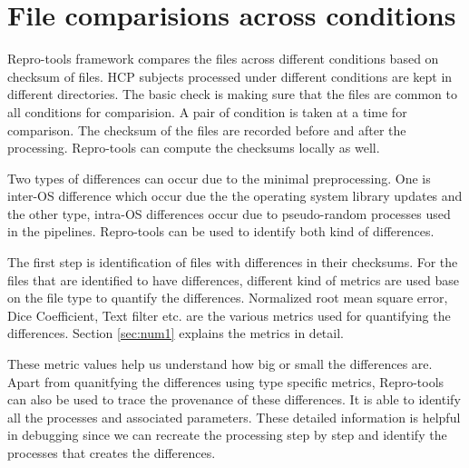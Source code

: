 \section{File comparisions across conditions}
Repro-tools framework compares the files across different conditions based on checksum of files. HCP subjects processed under different conditions are kept in different directories. The basic check is making sure that the files are common to all conditions for comparision. A pair of condition is taken at a time for comparison. The checksum of the files are recorded before and after the processing. Repro-tools can compute the checksums locally as well. 

Two types of differences can occur due to the minimal preprocessing. One is inter-OS difference which occur due the the operating system library updates and the other type, intra-OS differences occur due to pseudo-random processes used in the pipelines. Repro-tools can be used to identify both kind of differences.

The first step is identification of files with differences in their checksums. For the files that are identified to have differences, different kind of metrics are used base on the file type to quantify the differences. Normalized root mean square error, Dice Coefficient, Text filter etc. are the various metrics used for quantifying the differences. Section \ref{sec:num1} explains the metrics in detail. 

These metric values help us understand how big or small the differences are. Apart from quanitfying the differences using type specific metrics, Repro-tools can also be used to trace the provenance of these differences. It is able to identify all the processes and associated parameters. These detailed information is helpful in debugging since we can recreate the processing step by step and identify the processes that creates the differences.


